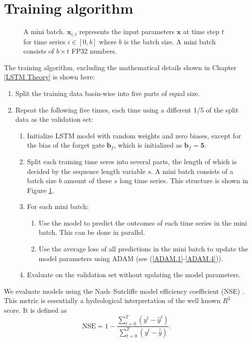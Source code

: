 \section{Training algorithm}
\begin{figure}
\centering

    \caption[A mini batch.]{A mini batch. $\bm{x}_{i,t}$ represents the input parameters $\bm{x}$ at time step $t$ for time series $i \in [0, b]$ where $b$ is the batch size. A mini batch consists of $b \times t$ FP32 numbers.}
\label{mini batch}
\end{figure}
The training algorithm, excluding the mathematical details shown in Chapter \ref{LSTM Theory} 
is shown here:
\begin{enumerate}
    \item Split the training data basin-wise into five parts of equal size.
    \item Repeat the following five times, each time using a different 1/5 of the 
        split data as the validation set: \begin{enumerate}
            \item Initialize LSTM model with random weights and zero biases, except for the bias of the forget gate $\bm{b}_f$, which is initialized as $\bm{b}_f=\bm{5}$.
        \item Split each training time seres into several parts, the length 
            of which is decided by the sequence length variable $s$. A mini batch 
            consists of a batch size $b$ amount of these $s$ long time series. This 
                structure is shown in Figure \ref{mini batch}.
        \item For each mini batch:
        \begin{enumerate}
            \item Use the model to predict the outcomes of each time series in the 
                mini batch. This can be done in parallel.
            \item Use the average loss of all predictions in the mini batch to update 
                the model parameters using ADAM (see (\ref{ADAM.1}-\ref{ADAM.4})).
        \end{enumerate}
        \item Evaluate on the validation set without updating the model parameters.
    \end{enumerate}
\end{enumerate}
We evaluate models using the Nash–Sutcliffe model efficiency coefficient (NSE) \citep{NSE}.
This metric is essentially a hydrological interpretation of the well known $R^2$ score.
It is defined as 
\begin{equation}
    \text{NSE} = 1 - \frac{\sum_{t=0}^T\left( y^t - \hat{y}^t\right)}{\sum_{t=0}^T\left(y^t - \bar{\hat{y}}\right)}. \label{NSE}
\end{equation}

